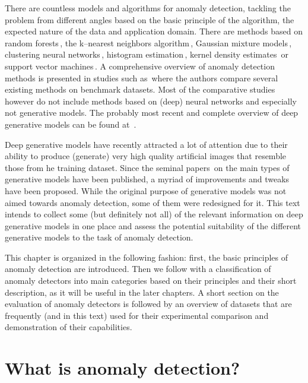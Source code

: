 There are countless models and algorithms for anomaly detection, tackling the problem from different angles based on the basic principle of the algorithm, the expected nature of the data and application domain. There are methods based on random forests\,\cite{liu2008isolation}, the k--nearest neighbors algorithm\,\cite{harmeling2006outliers}, Gaussian mixture models\,\cite{mahadevan2010anomaly}, clustering neural networks\,\cite{schlegl2017unsupervised}, histogram estimation\,\cite{pevny2016loda}, kernel density estimates\,\cite{latecki2007outlier} or support vector machines\,\cite{scholkopf2001estimating}. A comprehensive overview of anomaly detection methods is presented in studies such as\,\cite{pimentel2014review,goldstein2016comparative,lazarevic2003comparative,chandola2009anomaly,campos2016evaluation} where the authors compare several existing methods on benchmark datasets. Most of the comparative studies however do not include methods based
on (deep) neural networks and especially not generative models. The probably most recent and complete overview of deep generative models can be found at~\cite{ruff2020unifying}.

Deep generative models have recently attracted a lot of attention due to their ability to produce (generate) very high quality artificial images that resemble those from he training dataset. Since the seminal papers\,\cite{goodfellow2014gan,kingma2013vae,dinh2014nice} on the main types of generative models have been published, a myriad of improvements and tweaks have been proposed. While the original purpose of generative models was not aimed towards anomaly detection, some of them were redesigned for it. This text intends to collect some (but definitely not all) of the relevant information on deep generative models in one place and assess the potential suitability of the different generative models to the task of anomaly detection.

This chapter is organized in the following fashion: first, the basic principles of anomaly detection are introduced. Then we follow with a classification of anomaly detectors into main categories based on their principles and their short description, as it will be useful in the later chapters. A short section on the evaluation of anomaly detectors is followed by an overview of datasets that are frequently (and in this text) used for their experimental comparison and demonstration of their capabilities.

\section{What is anomaly detection?}

